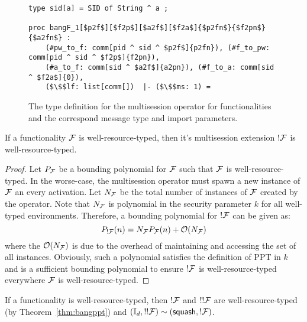 \begin{figure*}
\begin{lstlisting}[basicstyle=\small\BeraMonottFamily, frame=single, mathescape]
type sid[a] = SID of String ^ a ;

proc bangF_1[$p2f$][$f2p$][$a2f$][$f2a$]{$p2fn$}{$f2pn$}{$a2fn$} : 
	(#pw_to_f: comm[pid ^ sid ^ $p2f$]{p2fn}), (#f_to_pw: comm[pid ^ sid ^ $f2p$]{f2pn}),
	(#a_to_f: comm[sid ^ $a2f$]{a2pn}), (#f_to_a: comm[sid ^ $f2a$]{0}),
	($\$$lf: list[comm[])  |- ($\$$ms: 1) =
\end{lstlisting}
\caption{The type definition for the multisession operator for functionalities and the correspond message type and import parameters.}
\label{lst:bangf}
\end{figure*}


\begin{theorem}[PPT !]\label{thm:bangppt}
If a functionality $\mathcal{F}$ is well-resource-typed, then it's multisession extension $!\mathcal{F}$ is well-resource-typed.
\end{theorem}

\begin{proof}
Let $P_{\mathcal{F}}$ be a bounding polynomial for $\mathcal{F}$ such that $\mathcal{F}$ is well-resource-typed. 
In the worse-case, the multisession operator must spawn a new instance of $\mathcal{F}$ an every activation. 
Let $N_{\mathcal{F}}$ be the total number of instances of $\mathcal{F}$ created by the operator.
Note that $N_{\mathcal{F}}$ is polynomial in the security parameter $k$ for all well-typed environments.
Therefore, a bounding polynomial for $!\mathcal{F}$ can be given as:
$$ P_{!\mathcal{F}}(n) = N_{\mathcal{F}} P_{\mathcal{F}}(n) + \mathcal{O}(N_{\mathcal{F}}) $$
where the $\mathcal{O}(N_{\mathcal{F}})$ is due to the overhead of maintaining and accessing the set of all instances.
Obviously, such a polynomial satisfies the definition of PPT in $k$ and is a sufficient bounding polynomial to ensure $!\mathcal{F}$ is well-resource-typed everywhere $\mathcal{F}$ is well-resource-typed.
\end{proof}

\begin{theorem}
If a functionality \F is well-resource-typed, then $!\mathcal{F}$ and $!!\mathcal{F}$ are well-resource-typed (by Theorem~\ref{thm:bangppt}) and $(\mathbb{I}_d, !!\mathcal{F}) \sim ({\mathsf {squash}}, !\mathcal{F})$.
\end{theorem}

